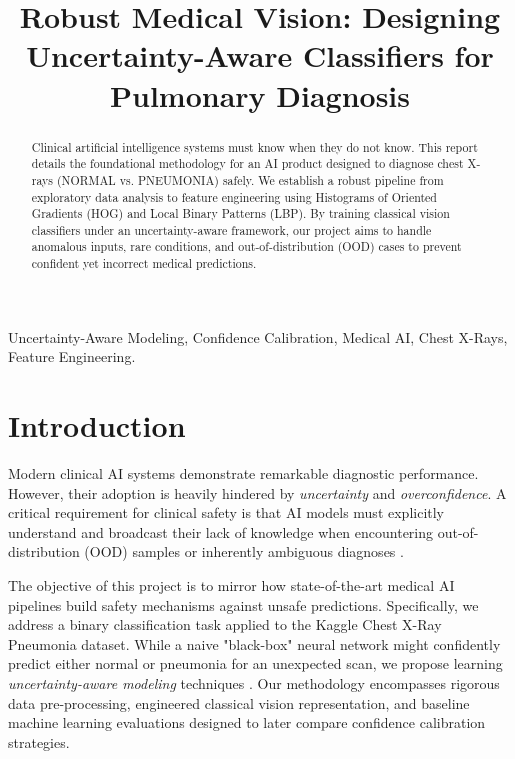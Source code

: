 \documentclass[conference]{IEEEtran}
\begin{document}
\title{Robust Medical Vision: Designing Uncertainty-Aware Classifiers for Pulmonary Diagnosis}

\author{
}

\maketitle

\begin{abstract}
Clinical artificial intelligence systems must know when they do not know. 
This report details the foundational methodology for an AI product designed to diagnose chest X-rays (NORMAL vs. PNEUMONIA) safely. 
We establish a robust pipeline from exploratory data analysis to feature engineering using Histograms of Oriented Gradients (HOG) and Local Binary Patterns (LBP). 
By training classical vision classifiers under an uncertainty-aware framework, our project aims to handle anomalous inputs, rare conditions, and out-of-distribution (OOD) cases to prevent confident yet incorrect medical predictions.
\end{abstract}

\begin{IEEEkeywords}
Uncertainty-Aware Modeling, Confidence Calibration, Medical AI, Chest X-Rays, Feature Engineering.
\end{IEEEkeywords}

\section{Introduction}
Modern clinical AI systems demonstrate remarkable diagnostic performance. 
However, their adoption is heavily hindered by \textit{uncertainty} and \textit{overconfidence}. 
A critical requirement for clinical safety is that AI models must explicitly understand and broadcast their lack of knowledge when encountering out-of-distribution (OOD) samples or inherently ambiguous diagnoses \cite{begoli2019need}.

The objective of this project is to mirror how state-of-the-art medical AI pipelines build safety mechanisms against unsafe predictions. 
Specifically, we address a binary classification task applied to the Kaggle Chest X-Ray Pneumonia dataset. 
While a naive "black-box" neural network might confidently predict either normal or pneumonia for an unexpected scan, we propose learning \textit{uncertainty-aware modeling} techniques \cite{kompa2021second}. 
Our methodology encompasses rigorous data pre-processing, engineered classical vision representation, and baseline machine learning evaluations designed to later compare confidence calibration strategies.
\end{document}
